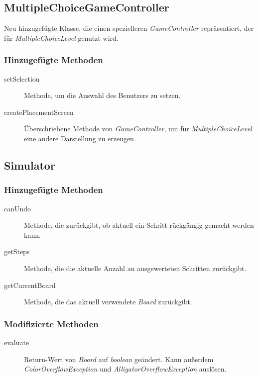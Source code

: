 \subsection{MultipleChoiceGameController}
Neu hinzugefügte Klasse, die einen spezielleren \emph{GameController} repräsentiert, der für \emph{MultipleChoiceLevel} genutzt wird.

\subsubsection{Hinzugefügte Methoden}
\begin{description}
\item[setSelection]
Methode, um die Auswahl des Benutzers zu setzen.
\item[createPlacementScreen]
Überschriebene Methode von \emph{GameController}, um für \emph{MultipleChoiceLevel} eine andere Darstellung zu erzeugen.
\end{description}


\subsection{Simulator}

\subsubsection{Hinzugefügte Methoden}
\begin{description}
\item[canUndo]
Methode, die zurückgibt, ob aktuell ein Schritt rückgängig gemacht werden kann.

\item[getSteps]
Methode, die die aktuelle Anzahl an ausgewerteten Schritten zurückgibt.

\item[getCurrentBoard]
Methode, die das aktuell verwendete \emph{Board} zurückgibt.

\end{description}

\subsubsection{Modifizierte Methoden}
\begin{description}
\item[evaluate]
Return-Wert von \emph{Board} auf \emph{boolean} geändert.
Kann außerdem \emph{ColorOverflowException} und \emph{AlligatorOverflowException} auslösen.

\end{description}
